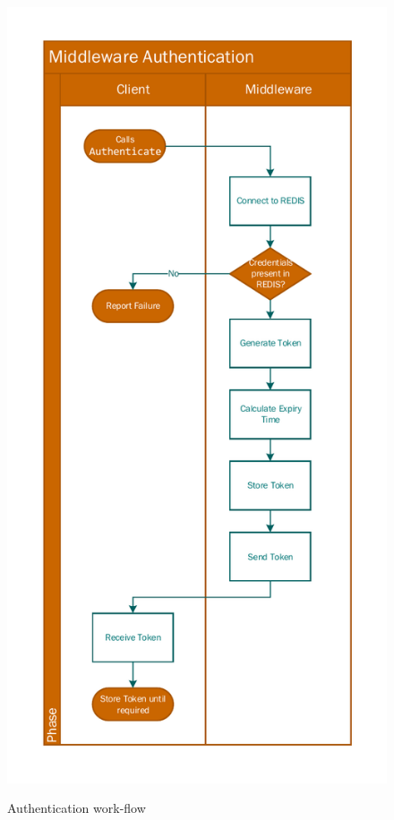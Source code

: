  \begin{figure}[!htbp]
\myfloatalign
{\includegraphics[width=\linewidth]{gfx/MiddlewareAurthentication}} 
\caption{Authentication work-flow}
\label{fig:aurth}
\end{figure}

